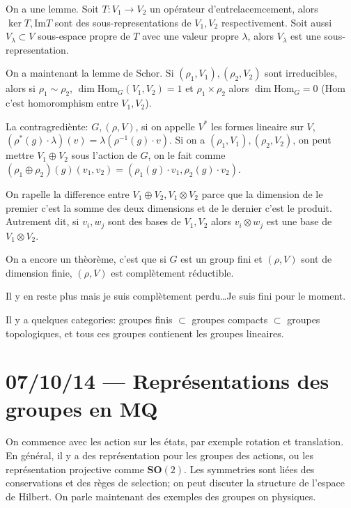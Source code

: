 \documentclass[10pt]{report}
\begin{document}
On a une lemme. Soit $T: V_1 \to V_2$ un op\'erateur d'entrelacemcement, alors $\ker T, \mathrm{Im} T$ sont des sous-representations de $V_1, V_2$ respectivement. Soit aussi $V_\lambda \subset V$ sous-espace propre de $T$ avec une valeur propre $\lambda$, alors $V_\lambda$ est une sous-representation. 

On a maintenant la lemme de Schor. Si $(\rho_1, V_1), (\rho_2, V_2)$ sont irreducibles, alors si $\rho_1 \sim \rho_2$, $\dim \mathrm{Hom}_G(V_1, V_2) = 1$ et $\rho_1 \times \rho_2$ alors $\dim \mathrm{Hom}_G = 0$ ($\mathrm{Hom}$ c'est homoromphism entre $V_1, V_2$).

La contragredi\`ente: $G, (\rho,V)$, si on appelle $V^*$ les formes lineaire sur $V$, $\left(\rho^*(g) \cdot \lambda\right)(v) = \lambda\left( \rho^{-1}(g) \cdot v \right)$. Si on a $(\rho_1, V_1), (\rho_2, V_2)$, on peut mettre $V_1 \oplus V_2$ sous l'action de $G$, on le fait comme $\left( \rho_1 \oplus \rho_2 \right)(g)(v_1, v_2) = \left( \rho_1(g)\cdot v_1, \rho_2(g) \cdot v_2 \right)$.

On rapelle la difference entre $V_1 \oplus V_2, V_1 \otimes V_2$ parce que la dimension de le premier c'est la somme des deux dimensions et de le dernier c'est le produit. Autrement dit, si $v_i, w_j$ sont des bases de $V_1, V_2$ alors $v_i \otimes w_j$ est une base de $V_1 \otimes V_2$.

On a encore un th\`eor\`eme, c'est que si $G$ est un group fini et $(\rho,V)$ sont de dimension finie, $(\rho,V)$ est compl\`etement r\'eductible.

Il y en reste plus mais je suis compl\`etement perdu\dots Je suis fini pour le moment.

Il y a quelques categories: groupes finis $\subset$ groupes compacts $\subset$ groupes topologiques, et tous ces groupes contienent les groupes lineaires.

\chapter{07/10/14 --- Repr\'esentations des groupes en MQ}

On commence avec les action sur les \'etats, par exemple rotation et translation. En g\'en\'eral, il y a des repr\'esentation pour les groupes des actions, ou les repr\'esentation projective comme $\mathbf{SO}(2)$. Les symmetries sont li\'ees des conservations et des r\`eges de selection; on peut discuter la structure de l'espace de Hilbert. On parle maintenant des exemples des groupes on physiques.
\end{document}
